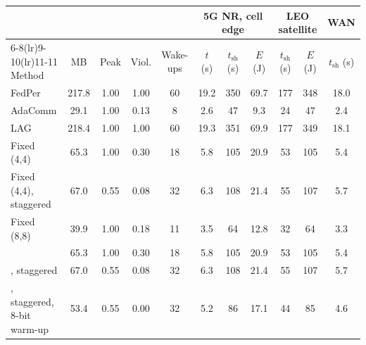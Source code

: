 \begin{tabular}{@{}lcccccccccc@{}}
\toprule
 & & & & & \multicolumn{3}{c}{5G NR, cell edge} & \multicolumn{2}{c}{LEO satellite} & WAN\\
\cmidrule(lr){6-8}\cmidrule(lr){9-10}\cmidrule(lr){11-11}
Method & MB & Peak & Viol. & Wake-ups & $t$ (s) & $t_{\mathrm{sh}}$ (s) & $E$ (J) & $t_{\mathrm{sh}}$ (s) & $E$ (J) & $t_{\mathrm{sh}}$ (s)\\
\midrule
FedPer & 217.8 & 1.00 & 1.00 & 60 & 19.2 & 350 & 69.7 & 177 & 348 & 18.0\\
AdaComm & 29.1 & 1.00 & 0.13 & 8 & 2.6 & 47 & 9.3 & 24 & 47 & 2.4\\
LAG & 218.4 & 1.00 & 1.00 & 60 & 19.3 & 351 & 69.9 & 177 & 349 & 18.1\\
Fixed (4,4) & 65.3 & 1.00 & 0.30 & 18 & 5.8 & 105 & 20.9 & 53 & 105 & 5.4\\
Fixed (4,4), staggered & 67.0 & 0.55 & 0.08 & 32 & 6.3 & 108 & 21.4 & 55 & 107 & 5.7\\
Fixed (8,8) & 39.9 & 1.00 & 0.18 & 11 & 3.5 & 64 & 12.8 & 32 & 64 & 3.3\\
\tierfed{} & 65.3 & 1.00 & 0.30 & 18 & 5.8 & 105 & 20.9 & 53 & 105 & 5.4\\
\tierfed{}, staggered & 67.0 & 0.55 & 0.08 & 32 & 6.3 & 108 & 21.4 & 55 & 107 & 5.7\\
\tierfed{}, staggered, 8-bit warm-up & 53.4 & 0.55 & 0.00 & 32 & 5.2 & 86 & 17.1 & 44 & 85 & 4.6\\
\bottomrule
\end{tabular}

